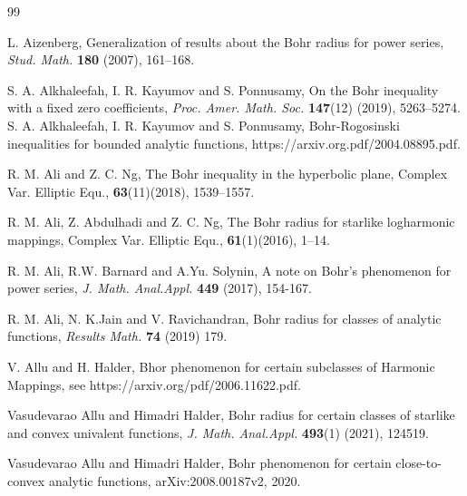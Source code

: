 \documentclass[a4paper,12pt]{amsart}
\theoremstyle{plain}
\theoremstyle{definition}
\begin{document}
\begin{thebibliography}{99}
	
	 {\sc L. Aizenberg}, Generalization of results about the Bohr radius for power series, {\it Stud. Math.}  {\bf 180}  (2007), 161--168.  
	
	 {\sc S. A. Alkhaleefah}, {\sc I. R. Kayumov} and {\sc S. Ponnusamy}, On the Bohr inequality with a fixed zero coefficients, {\it Proc. Amer. Math. Soc.} \textbf{147}(12) (2019), 5263--5274.
	  {\sc S. A. Alkhaleefah}, {\sc I. R. Kayumov} and {\sc S. Ponnusamy}, Bohr-Rogosinski inequalities for bounded analytic functions, https://arxiv.org.pdf/2004.08895.pdf.
	
	 {\sc R. M. Ali} and {\sc Z. C. Ng}, The Bohr inequality in the hyperbolic plane, Complex Var. Elliptic Equ., \textbf{63}(11)(2018), 1539--1557.
	
	 {\sc R. M. Ali}, {\sc Z. Abdulhadi} and {\sc Z. C. Ng}, The Bohr radius for starlike logharmonic mappings, Complex Var. Elliptic Equ., \textbf{61}(1)(2016), 1--14.
	
	 {\sc R. M. Ali, R.W. Barnard} and {\sc  A.Yu. Solynin}, A note on Bohr's phenomenon for power series, {\it J. Math. Anal.Appl.} {\bf 449} (2017), 154-167.
	
	 {\sc R. M. Ali, N. K.Jain} and {\sc V. Ravichandran}, Bohr radius for classes of analytic functions, {\it Results Math.} {\bf 74} (2019) 179.
	
	
	 {\sc V. Allu} and {\sc H. Halder},  Bhor phenomenon for certain subclasses of Harmonic Mappings, see https://arxiv.org/pdf/2006.11622.pdf.
	
		 {\sc Vasudevarao Allu} and {\sc Himadri Halder}, Bohr radius for certain classes of starlike and convex univalent functions, {\it J. Math. Anal.Appl.} {\bf 493}(1) (2021), 124519.
	
		 {\sc Vasudevarao Allu} and {\sc Himadri Halder}, Bohr phenomenon for certain close-to-convex analytic functions,  arXiv:2008.00187v2, 2020.
	

\end{thebibliography}
\end{document}
